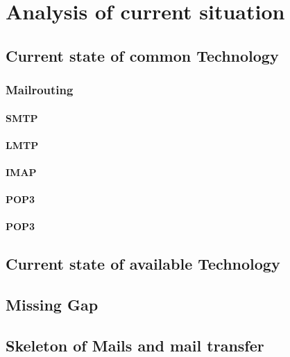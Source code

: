 \chapter{Analysis of current situation\label{chap:analysis}}
\section{Current state of common Technology}
\subsection{Mailrouting}
\subsubsection{SMTP}
\subsubsection{LMTP}
\subsubsection{IMAP}
\subsubsection{POP3}
\subsubsection{POP3}
\section{Current state of available Technology}
\section{Missing Gap}
\section{Skeleton of Mails and mail transfer}



